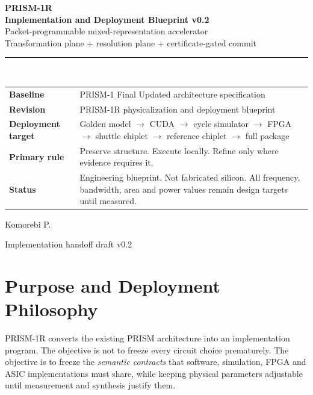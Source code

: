 \documentclass[10pt,letterpaper]{article}
\begin{document}
\thispagestyle{empty}
\vspace*{0.55in}
\begin{center}
{\Huge\bfseries PRISM-1R}\\[0.12in]
{\LARGE\bfseries Implementation and Deployment Blueprint v0.2}\\[0.18in]
{\large Packet-programmable mixed-representation accelerator}\\[0.05in]
{\large Transformation plane + resolution plane + certificate-gated commit}\\[0.45in]

\rule{0.90\linewidth}{0.8pt}\\[0.28in]

\begin{tabularx}{0.88\linewidth}{>{\bfseries}p{1.55in}X}
Baseline & PRISM-1 Final Updated architecture specification \\
Revision & PRISM-1R physicalization and deployment blueprint \\
Deployment target & Golden model $\rightarrow$ CUDA $\rightarrow$ cycle simulator $\rightarrow$ FPGA $\rightarrow$ shuttle chiplet $\rightarrow$ reference chiplet $\rightarrow$ full package \\
Primary rule & Preserve structure. Execute locally. Refine only where evidence requires it. \\
Status & Engineering blueprint. Not fabricated silicon. All frequency, bandwidth, area and power values remain design targets until measured. \\
\end{tabularx}

\vfill
{\large Komorebi P.}\par
\vspace{0.08in}
{\small Implementation handoff draft v0.2}\par
\end{center}
\newpage

\tableofcontents
\newpage

\section{Purpose and Deployment Philosophy}

PRISM-1R converts the existing PRISM architecture into an implementation program. The objective is not to freeze every circuit choice prematurely. The objective is to freeze the \emph{semantic contracts} that software, simulation, FPGA and ASIC implementations must share, while keeping physical parameters adjustable until measurement and synthesis justify them.
\end{document}
